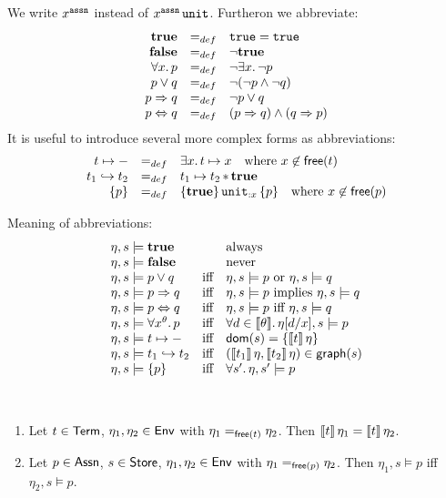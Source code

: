 \documentclass[12pt,a4paper]{article}
\begin{document}
We write $x^{\tassn}$ instead of $\app{x^{\tassn}}{\unit}$.
Furtheron we abbreviate:
\[\begin{array}{rcl}
  \mathbf{true} &=_{def}& \mathtt{true} = \mathtt{true} \\
  \mathbf{false} &=_{def}& \neg \mathbf{true} \\
  \forall x.\,p &=_{def}& \neg \exists x.\,\neg p \\
  p \vee q &=_{def}& \neg (\neg p \wedge \neg q) \\
  p \Rightarrow q &=_{def}& \neg p \vee q \\
  p \Leftrightarrow q &=_{def}& (p \Rightarrow q) \wedge (q \Rightarrow p)
\end{array}\]
It is useful to introduce several more complex forms as abbreviations:
\[\begin{array}{rcl}
  t \mapsto - &=_{def}& \exists x.\,t \mapsto x \quad \text{where $x\not\in\mathsf{free}(t)$} \\
  t_1 \hookrightarrow t_2 &=_{def}& t_1 \mapsto t_2 \operatorname{\ast} \mathbf{true} \\
  \{p\} &=_{def}& \{\mathbf{true}\}\,{\mathtt{unit}}_{:{x}}\,\{p\} \quad \text{where $x\not\in\mathsf{free}(p)$}
\end{array}\]

Meaning of abbreviations:
\[\begin{array}{lcl}
  \eta,s \models \mathbf{true}
  && \text{always} \\
  \eta,s \models \mathbf{false}
  && \text{never} \\
  \eta,s \models p \vee q
  &\text{iff}& \eta,s \models p \text{ or } \eta,s \models q \\
  \eta,s \models p \Rightarrow q
  &\text{iff}& \eta,s \models p \text{ implies } \eta,s \models q \\
  \eta,s \models p \Leftrightarrow q
  &\text{iff}& \eta,s \models p \text{ iff } \eta,s \models q \\
  \eta,s \models \forall x^\theta.\,p
  &\text{iff}& \forall d\in \llbracket\theta\rrbracket.\,\eta[d/x],s \models p \\
  \eta,s \models t \mapsto -
  &\text{iff}& \mathsf{dom}(s) = \{\llbracket t\rrbracket\,\eta\} \\
  \eta,s \models t_1 \hookrightarrow t_2
  &\text{iff}& (\llbracket t_1\rrbracket\,\eta,\llbracket t_2\rrbracket\,\eta)\in\mathsf{graph}(s) \\
  \eta,s \models \{p\}
  &\text{iff}& \forall s'.\,\eta,s' \models p
\end{array}\]

\begin{lemma} \label{lemma:Coincidence} \
  \begin{enumerate}
  \item Let $t\in\mathsf{Term}$, $\eta_1,\eta_2\in\mathsf{Env}$ with $\eta_1 =_{\mathsf{free}(t)} \eta_2$. Then
    $\llbracket t\rrbracket\,\eta_1 = \llbracket t\rrbracket\,\eta_2$.
  \item Let $p\in\mathsf{Assn}$, $s\in\mathsf{Store}$, $\eta_1,\eta_2\in\mathsf{Env}$ with $\eta_1 =_{\mathsf{free}(p)} \eta_2$. Then
    $\eta_1,s \models p$ iff $\eta_2,s\models p$.
  \end{enumerate}
\end{lemma}
\end{document}
